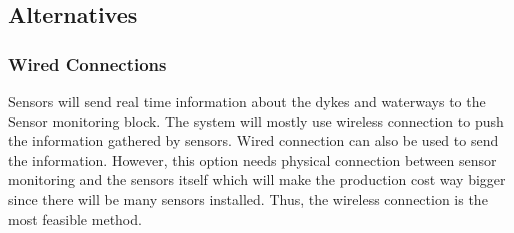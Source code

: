 \subsection{Alternatives}

\subsubsection*{Wired Connections}
Sensors will send real time information about the dykes and waterways to the Sensor monitoring block. The system will mostly use wireless connection to push the information gathered by sensors. Wired connection can also be used to send the information. However, this option needs physical connection between sensor monitoring and the sensors itself which will make the production cost way bigger since there will be many sensors installed. Thus, the wireless connection is the most feasible method.
